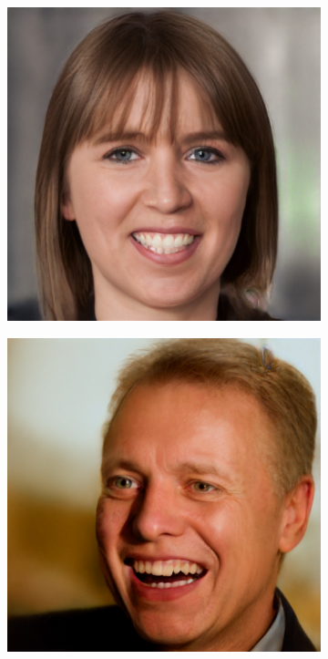 \begin{figure}
\begin{subfigure}[b]{0.24\textwidth}
    \end{subfigure}
    \begin{subfigure}[b]{0.24\textwidth}
        \includegraphics[width=\textwidth]{fig/stylegan/faceedit/mette-smile}
    \end{subfigure}
    \begin{subfigure}[b]{0.24\textwidth}
        \includegraphics[width=\textwidth]{fig/stylegan/faceedit/uffe-smile}
    \end{subfigure}


\end{figure}
